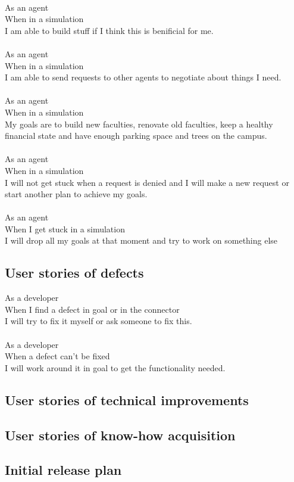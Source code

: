 \\
As an agent\\
When in a simulation\\
I am able to build stuff if I think this is benificial for me.\\
\\
As an agent\\
When in a simulation\\
I am able to send requests to other agents to negotiate about things I need.\\
\\
As an agent\\
When in a simulation\\
My goals are to build new faculties, renovate old faculties, keep a healthy financial state and have enough parking space and trees on the campus.\\
\\
As an agent\\
When in a simulation\\
I will not get stuck when a request is denied and I will make a new request or start another plan to achieve my goals.\\
\\
As an agent\\
When I get stuck in a simulation\\
I will drop all my goals at that moment and try to work on something else\\
\subsection{User stories of defects}
As a developer\\
When I find a defect in goal or in the connector\\
I will try to fix it myself or ask someone to fix this.\\
\\
As a developer\\
When a defect can't be fixed\\
I will work around it in goal to get the functionality needed.\\
\subsection{User stories of technical improvements}
\subsection{User stories of know-how acquisition}
\subsection{Initial release plan}